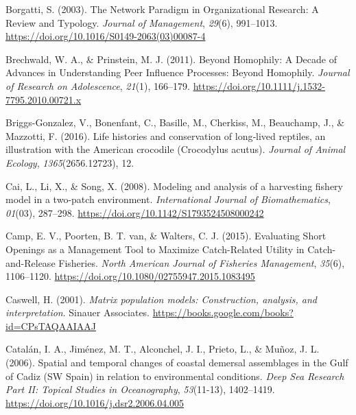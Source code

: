 \documentclass[
]{article}
\newlength{\cslhangindent}
\newlength{\cslentryspacingunit} %
\newenvironment{CSLReferences}[2] %
 {%
  \setlength{\parindent}{0pt}
  \ifodd #1
  \let\oldpar\par
  \def\par{\hangindent=\cslhangindent\oldpar}
  \fi
  \setlength{\parskip}{#2\cslentryspacingunit}
 }%
 {}
\begin{document}
\begin{CSLReferences}{1}{2}
\leavevmode{}%
Borgatti, S. (2003). The {Network} {Paradigm} in {Organizational} {Research}: {A} {Review} and {Typology}. \emph{Journal of Management}, \emph{29}(6), 991--1013. \url{https://doi.org/10.1016/S0149-2063(03)00087-4}

\leavevmode{}%
Brechwald, W. A., \& Prinstein, M. J. (2011). Beyond {Homophily}: {A} {Decade} of {Advances} in {Understanding} {Peer} {Influence} {Processes}: {Beyond} {Homophily}. \emph{Journal of Research on Adolescence}, \emph{21}(1), 166--179. \url{https://doi.org/10.1111/j.1532-7795.2010.00721.x}

\leavevmode{}%
Briggs-Gonzalez, V., Bonenfant, C., Basille, M., Cherkiss, M., Beauchamp, J., \& Mazzotti, F. (2016). Life histories and conservation of long‐lived reptiles, an illustration with the {American} crocodile ({Crocodylus} acutus). \emph{Journal of Animal Ecology}, \emph{1365}(2656.12723), 12.

\leavevmode{}%
Cai, L., Li, X., \& Song, X. (2008). Modeling and analysis of a harvesting fishery model in a two-patch environment. \emph{International Journal of Biomathematics}, \emph{01}(03), 287--298. \url{https://doi.org/10.1142/S1793524508000242}

\leavevmode{}%
Camp, E. V., Poorten, B. T. van, \& Walters, C. J. (2015). Evaluating {Short} {Openings} as a {Management} {Tool} to {Maximize} {Catch}-{Related} {Utility} in {Catch}-and-{Release} {Fisheries}. \emph{North American Journal of Fisheries Management}, \emph{35}(6), 1106--1120. \url{https://doi.org/10.1080/02755947.2015.1083495}

\leavevmode{}%
Caswell, H. (2001). \emph{Matrix population models: {Construction}, analysis, and interpretation}. Sinauer Associates. \url{https://books.google.com/books?id=CPsTAQAAIAAJ}

\leavevmode{}%
Catalán, I. A., Jiménez, M. T., Alconchel, J. I., Prieto, L., \& Muñoz, J. L. (2006). Spatial and temporal changes of coastal demersal assemblages in the {Gulf} of {Cadiz} ({SW} {Spain}) in relation to environmental conditions. \emph{Deep Sea Research Part II: Topical Studies in Oceanography}, \emph{53}(11-13), 1402--1419. \url{https://doi.org/10.1016/j.dsr2.2006.04.005}


\end{CSLReferences}
\end{document}
